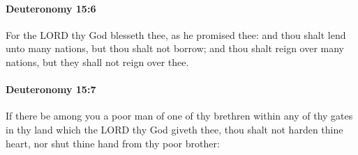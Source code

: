 		\paragraph{Deuteronomy 15:6} %
			\label{DEUTERONOMY-15-6}

			For the LORD thy God blesseth thee, as he promised thee: and thou shalt lend unto many nations, but thou shalt not borrow; and thou shalt reign over many nations, but they shall not reign over thee.


		\paragraph{Deuteronomy 15:7} %
			\label{DEUTERONOMY-15-7}

			If there be among you a poor man of one of thy brethren within any of thy gates in thy land which the LORD thy God giveth thee, thou shalt not harden thine heart, nor shut thine hand from thy poor brother:

